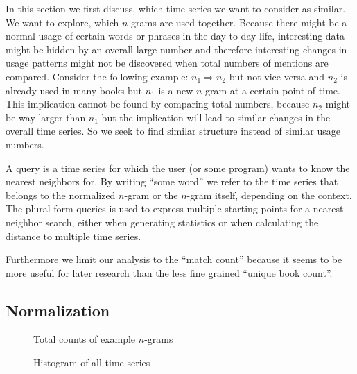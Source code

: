 In this section we first discuss, which time series we want to consider as similar. We want to explore, which $n$-grams are used together. Because there might be a normal usage of certain words or phrases in the day to day life, interesting data might be hidden by an overall large number and therefore interesting changes in usage patterns might not be discovered when total numbers of mentions are compared. Consider the following example: $n_1 \Rightarrow n_2$ but not vice versa and $n_2$ is already used in many books but $n_1$ is a new $n$-gram at a certain point of time. This implication cannot be found by comparing total numbers, because $n_2$ might be way larger than $n_1$ but the implication will lead to similar changes in the overall time series. So we seek to find similar structure instead of similar usage numbers.

\begin{definition}[Query]
    A query is a time series for which the user (or some program) wants to know the nearest neighbors for. By writing \enquote{some word} we refer to the time series that belongs to the normalized $n$-gram or the $n$-gram itself, depending on the context. The plural form queries is used to express multiple starting points for a nearest neighbor search, either when generating statistics or when calculating the distance to multiple time series.
\end{definition}

Furthermore we limit our analysis to the \enquote{match count} because it seems to be more useful for later research than the less fine grained \enquote{unique book count}.


\subsection{Normalization}
\label{ssec:baseline:sim:norm}

\begin{figure}
    \centering
    
    \caption{Total counts of example $n$-grams}\label{fig:ngrams_ex_total}
\end{figure}

\begin{figure}
    \centering
    
    \caption{Histogram of all time series}\label{fig:ngrams_hist}
\end{figure}

